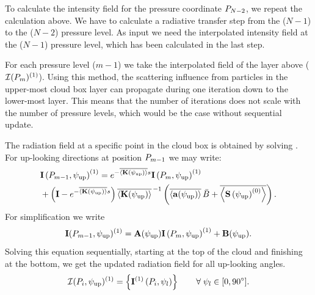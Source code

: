 To calculate the intensity field for the pressure coordinate
$P_{N-2}$, we repeat the calculation above. We have to calculate a
radiative transfer step from the ($N-1$) to the ($N-2$) pressure level.
As input we need the interpolated intensity field at the ($N-1$)
pressure level, which has been calculated in the last step.
  
For each pressure level ($m-1$) we take the interpolated field of the
layer above (${\mathcal I}(P_{m})^{(1)}$).  Using this method, the
scattering influence from particles in the upper-most cloud box
layer can propagate during one iteration down to the lower-most layer.
This means that the number of iterations does not scale with the
number of pressure levels, which would be the case without sequential
update.
  
The radiation field at a specific point in the cloud box is obtained by
solving . For up-looking directions at position
$P_{m-1}$ we may write:
\begin{eqnarray}
 & {\bf I}\left( P_{m-1},\psi_\mathrm{up} \right) ^{(1)}  =  
  e^{-\overline{\left\langle {\bf K} (\psi_\mathrm{up}) \right\rangle} s} 
  {\bf I}\left( P_m,\psi_\mathrm{up} \right)^{(1)}  \nonumber \\ &+
  \left( \mathbf{I} -  e^{-\overline{\left\langle {\bf K} (\psi_\mathrm{up}) \right\rangle} s}\right) 
  \overline{\left\langle {\bf K}(\psi_\mathrm{up}) \right\rangle}^{\,-1} 
  \left( \overline{\left\langle {\bf a} (\psi_\mathrm{up}) \right\rangle}\,  
    \bar{B} +
    \overline{\left\langle {\bf S}\left(\psi_\mathrm{up} \right)^{(0)} \right\rangle }
  \right).
\end{eqnarray}
For simplification we write
\begin{equation}
  {\bf I} ( P_{m-1},\psi_\mathrm{up})^{(1)} = 
  \mathbf{A}(\psi_\mathrm{up})  {\bf I}\left( P_m,\psi_\mathrm{up} \right)^{(1)} 
  + \mathbf{B} ( \psi_\mathrm{up}).
\end{equation}
Solving this equation sequentially, starting at the top of the cloud
and finishing at the bottom, we get the updated radiation field for
all up-looking angles.
\begin{equation} {\mathcal I}(P_i, \psi_\mathrm{up})^{(1)} =
  \left\{ {\bf I}^{(1)} \left( P_i,\psi_l \right) \right\} \qquad
  \forall \; \psi_{l} \in [0, 90^\circ].
\end{equation}

